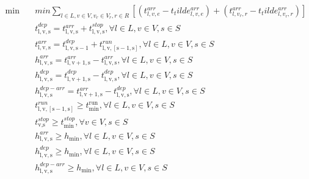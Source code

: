 \begin{align}
  \min\quad & m i n \sum_{l \in L, v \in V, v_{r} \in V_{r}, r \in R} \left[\left(t_{l , v , e}^{\mathit{arr}} - t_tilde_{l , v , e}^{\mathit{arr}}\right) + \left(t_{l , v_{r} , r}^{\mathit{arr}} - t_tilde_{l , v_{r} , r}^{\mathit{arr}}\right)\right] \tag{eq\_0004} \\
  & t_{\text{l},\text{v},\text{s}}^{\mathit{dep}} = t_{\text{l},\text{v},\text{s}}^{\mathit{arr}} + t_{\text{l},\text{v},\text{s}}^{\mathit{stop}} , \forall l \in L , v \in V , s \in S \tag{eq\_0009} \\
  & t_{\text{l},\text{v},\text{s}}^{\mathit{arr}} = t_{\text{l},\text{v},\text{s}-\text{1}}^{\mathit{dep}} + t_{\text{l},\text{v},[\text{s}-\text{1},\text{s}]}^{\mathit{run}} , \forall l \in L , v \in V , s \in S \tag{eq\_0010} \\
  & h_{\text{l},\text{v},\text{s}}^{\mathit{arr}} = t_{\text{l},\text{v}+\text{1},\text{s}}^{\mathit{arr}} - t_{\text{l},\text{v},\text{s}}^{\mathit{arr}} , \forall l \in L , v \in V , s \in S \tag{eq\_0011} \\
  & h_{\text{l},\text{v},\text{s}}^{\mathit{dep}} = t_{\text{l},\text{v}+\text{1},\text{s}}^{\mathit{dep}} - t_{\text{l},\text{v},\text{s}}^{\mathit{dep}} , \forall l \in L , v \in V , s \in S \tag{eq\_0012} \\
  & h_{\text{l},\text{v},\text{s}}^{\mathit{dep} - a r r} = t_{\text{l},\text{v}+\text{1},\text{s}}^{\mathit{arr}} - t_{\text{l},\text{v},\text{s}}^{\mathit{dep}} , \forall l \in L , v \in V , s \in S \tag{eq\_0013} \\
  & t_{\text{l},\text{v},[\text{s}-\text{1},\text{s}]}^{\mathit{run}} \geq t_{\text{min}}^{\text{run}} , \forall l \in L , v \in V , s \in S \tag{eq\_0014} \\
  & t_{\text{v},\text{s}}^{\mathit{stop}} \geq t_{\text{min}}^{\mathit{stop}} , \forall v \in V , s \in S \tag{eq\_0015} \\
  & h_{\text{l},\text{v},\text{s}}^{\mathit{arr}} \geq h_{\text{min}} , \forall l \in L , v \in V , s \in S \tag{eq\_0016} \\
  & h_{\text{l},\text{v},\text{s}}^{\mathit{dep}} \geq h_{\text{min}} , \forall l \in L , v \in V , s \in S \tag{eq\_0017} \\
  & h_{\text{l},\text{v},\text{s}}^{\mathit{dep} - a r r} \geq h_{\text{min}} , \forall l \in L , v \in V , s \in S \tag{eq\_0018} \\

\end{align}
